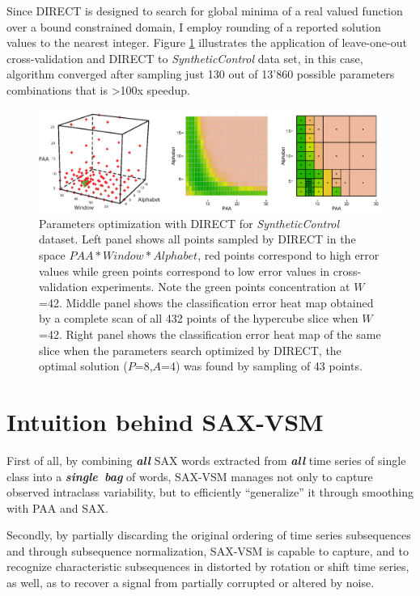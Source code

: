Since DIRECT is designed to search for global minima of a real valued function over 
a bound constrained domain, I employ rounding of a reported solution values to the nearest integer.
Figure \ref{fig:direct-sampling} illustrates the application of leave-one-out cross-validation and DIRECT to 
\textit{SyntheticControl} data set, in this case, algorithm converged after sampling just 130 out of 13'860 
possible parameters combinations that is \textgreater100x speedup.

\begin{figure}[t]
   \centering
   \includegraphics[width=140mm]{figures/figure_direct.eps}
   \caption{Parameters optimization with DIRECT for \textit{SyntheticControl} dataset. 
   Left panel shows all points sampled by DIRECT in the space \mbox{$PAA*Window*Alphabet$},
   red points correspond to high error values while green points correspond to low error values 
   in cross-validation experiments. 
   Note the green points concentration at $W$=42. 
   Middle panel shows the classification error heat map obtained by a complete scan 
   of all 432 points of the hypercube slice when $W$=42. 
   Right panel shows the classification error heat map of the same slice when 
   the parameters search optimized by DIRECT, 
   the optimal solution ($P$=8,$A$=4) was found by sampling of 43 points.}
   \label{fig:direct-sampling}
\end{figure}


\section{Intuition behind SAX-VSM}
First of all, by combining \textit{\textbf{all}} SAX words extracted from 
\textit{\textbf{all}} time series of single class into a \mbox{\textit{\textbf{single bag}}} of 
words, SAX-VSM manages not only to capture observed intraclass variability, 
but to efficiently ``generalize'' it through smoothing with PAA and SAX.  

Secondly, by partially discarding the original ordering of time series subsequences and
through subsequence normalization, SAX-VSM is capable to capture, and to recognize 
characteristic subsequences in distorted by rotation or shift time series, as well,
as to recover a signal from partially corrupted or altered by noise. 

